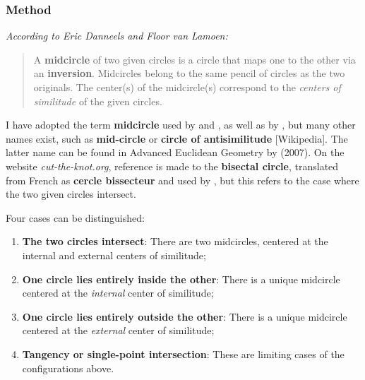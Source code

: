\begin{tkzexample}[latex=.5\textwidth]
\end{tkzexample}

\subsubsection{Method }
\label{ssub:midcircle}

\medskip
\noindent
\emph{According to Eric Danneels and Floor van Lamoen:}

\begin{quote}
A \textbf{midcircle} of two given circles is a circle that maps one to the other via an \textbf{inversion}. Midcircles belong to the same pencil of circles as the two originals. The center(s) of the midcircle(s) correspond to the \emph{centers of similitude} of the given circles.
\end{quote}

I have adopted the term \textbf{midcircle} used by  and , as well as by , but many other names exist, such as \textbf{mid-circle} or \textbf{circle of antisimilitude} [Wikipedia]. The latter name can be found in Advanced Euclidean Geometry by  (2007). On the website \textit{cut-the-knot.org}, reference is made to the \textbf{bisectal circle}, translated from French as \textbf{cercle bissecteur} and used by , but this refers to the case where the two given circles intersect.

\noindent
Four cases can be distinguished:

\begin{enumerate}[label=(\roman*)]
  \item \textbf{The two circles intersect}: There are two midcircles, centered at the internal and external centers of similitude;
  \item \textbf{One circle lies entirely inside the other}: There is a unique midcircle centered at the \emph{internal} center of similitude;
  \item \textbf{One circle lies entirely outside the other}: There is a unique midcircle centered at the \emph{external} center of similitude;
  \item \textbf{Tangency or single-point intersection}: These are limiting cases of the configurations above.
\end{enumerate}


